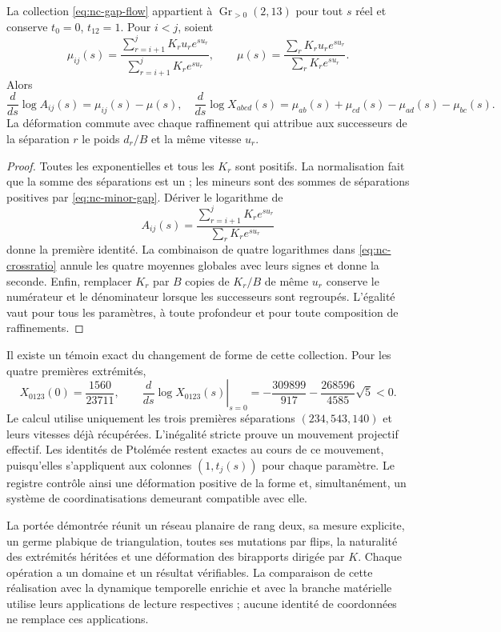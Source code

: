 \begin{theorem}
\label{thm:nc-shape-flow}
La collection \eqref{eq:nc-gap-flow} appartient à \(\operatorname{Gr}_{>0}(2,13)\) pour tout \(s\) réel et conserve \(t_0=0\), \(t_{12}=1\). Pour \(i<j\), soient
\[
 \mu_{ij}(s)=
 \frac{\sum_{r=i+1}^jK_ru_re^{su_r}}{\sum_{r=i+1}^jK_re^{su_r}},
 \qquad
 \mu(s)=\frac{\sum_rK_ru_re^{su_r}}{\sum_rK_re^{su_r}}.
\]
Alors
\begin{equation}
 \frac{d}{ds}\log A_{ij}(s)=\mu_{ij}(s)-\mu(s),
 \quad
 \frac{d}{ds}\log X_{abcd}(s)
 =\mu_{ab}(s)+\mu_{cd}(s)-\mu_{ad}(s)-\mu_{bc}(s).
 \label{eq:nc-crossratio-derivative}
\end{equation}
La déformation commute avec chaque raffinement qui attribue aux successeurs de la séparation \(r\) le poids \(d_r/B\) et la même vitesse \(u_r\).
\end{theorem}
\begin{proof}
Toutes les exponentielles et tous les \(K_r\) sont positifs. La normalisation
fait que la somme des séparations est un ; les mineurs sont des sommes de
séparations positives par \eqref{eq:nc-minor-gap}. Dériver le logarithme de
\[
 A_{ij}(s)=\frac{\sum_{r=i+1}^jK_re^{su_r}}
                      {\sum_rK_re^{su_r}}
\]
donne la première identité. La combinaison de quatre logarithmes dans \eqref{eq:nc-crossratio} annule les quatre moyennes globales avec leurs signes et donne la seconde. Enfin, remplacer \(K_r\) par \(B\) copies de \(K_r/B\) de même \(u_r\) conserve le numérateur et le dénominateur lorsque les successeurs sont regroupés. L'égalité vaut pour tous les paramètres, à toute profondeur et pour toute composition de raffinements.
\end{proof}

Il existe un témoin exact du changement de forme de cette collection. Pour les quatre premières extrémités,
\begin{equation}
 X_{0123}(0)=\frac{1560}{23711},\qquad
 \left.\frac{d}{ds}\log X_{0123}(s)\right|_{s=0}
 =-\frac{309899}{917}-\frac{268596}{4585}\sqrt5<0.
 \label{eq:nc-nontrivial-witness}
\end{equation}
Le calcul utilise uniquement les trois premières séparations \((234,543,140)\) et leurs vitesses déjà récupérées. L'inégalité stricte prouve un mouvement projectif effectif. Les identités de Ptolémée restent exactes au cours de ce mouvement, puisqu'elles s'appliquent aux colonnes \((1,t_j(s))\) pour chaque paramètre. Le registre contrôle ainsi une déformation positive de la forme et, simultanément, un système de coordinatisations demeurant compatible avec elle.

La portée démontrée réunit un réseau planaire de rang deux, sa mesure
explicite, un germe plabique de triangulation, toutes ses mutations par
flips, la naturalité des extrémités héritées et une déformation des
birapports dirigée par \(K\). Chaque opération a un domaine et un
résultat vérifiables. La comparaison de cette réalisation avec la
dynamique temporelle enrichie et avec la branche matérielle utilise leurs
applications de lecture respectives ; aucune identité de coordonnées ne remplace ces applications.
